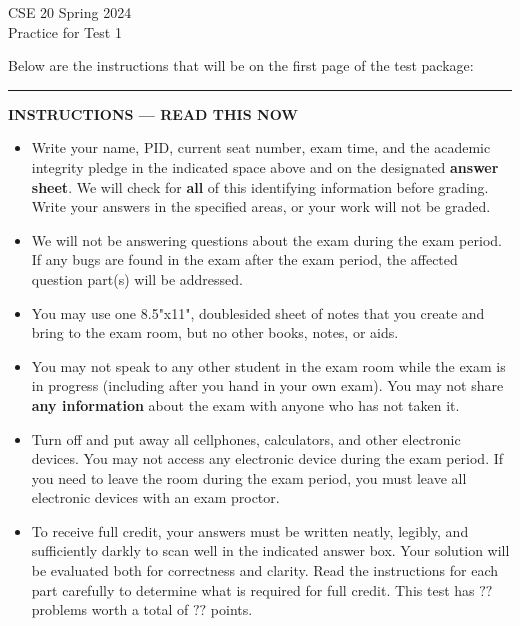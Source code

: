 \documentclass[12pt, oneside]{article}
\author{CSE20S24}
\newif \ifsolution
\begin{document}
\begin{center}
{\Large
CSE 20 Spring 2024\\ 
Practice for Test 1 \ifsolution{\qquad Solutions}\fi}
\end{center}

\thispagestyle{empty}

\ifsolution{}
\else{}
Below are the instructions that will be on the first page of the test package:

\begin{center}
  \begin{minipage}[t]{7in}
  \rule{\linewidth}{2pt}
  \textbf{INSTRUCTIONS --- READ THIS NOW}
  \begin{itemize}
  
  \setlength{\itemsep}{0.025in}
  
  \item  Write your name, PID, current seat number, exam time, 
  and the academic integrity pledge in the indicated space above and 
  on the designated  {\bf answer sheet}.
  We will check for {\bf all} of this identifying information before grading.
  Write your answers in the specified areas, or your work will not be graded. 
  
  \item We will not be answering questions about the exam during the exam period. 
  If any bugs are found in the exam after the exam period, the affected question part(s) will be addressed.
  
  \item  You may use one 8.5"x11", doublesided sheet of notes that you create and bring to the exam room, but no other books, notes, or aids.
  
  \item You may not speak to any other student in the exam room while the exam 
  is in progress (including after you hand in your own exam).  You may not share
  {\bf any information} about the exam with anyone who has not taken it.
  
  \item Turn off and put away all cellphones, calculators, and other electronic devices.
  You may not access any electronic device during the exam period. If you need to leave 
  the room during the exam period, you must leave all electronic devices with an exam proctor.
  
  \item  To receive full credit, your answers must
  be written neatly, legibly, and sufficiently darkly to scan well in the indicated answer box. Your solution will be evaluated both for correctness and clarity.
  Read the instructions for each part carefully to determine what is required for full credit.
  This test has $??$ problems worth a total of $??$ points.
  

\end{itemize}
\end{minipage}
\end{center}
\end{document}
